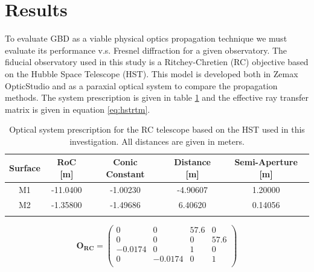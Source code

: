 \section{Results}
To evaluate GBD as a viable physical optics propagation technique we must evaluate its performance v.s. Fresnel diffraction for a given observatory. The fiducial observatory used in this study is a Ritchey-Chretien (RC) objective based on the Hubble Space Telescope (HST). This model is developed both in Zemax OpticStudio and as a paraxial optical system to compare the propagation methods. The system prescription is given in table \ref{tab:fiducial_observatory_specs} and the effective ray transfer matrix is given in equation \ref{eq:hstrtm}. 

\begin{table}[H]
    \centering
    \begin{tabular}{c c c c c}
        \hline
        Surface & RoC [m] & Conic Constant & Distance [m] & Semi-Aperture [m]  \\
        \hline
        M1 & -11.0400 & -1.00230 & -4.90607 & 1.20000 \\
        M2 & -1.35800 & -1.49686 &  6.40620 & 0.14056 \\
        \hline
        \\
    \end{tabular}
    \caption{Optical system prescription for the RC telescope based on the HST used in this investigation. All distances are given in meters. }
    \label{tab:fiducial_observatory_specs}
\end{table}

\begin{equation}
    \mathbf{O_{RC}} =
    \begin{pmatrix}
    0 & 0 & 57.6 & 0 \\
    0 & 0 & 0 & 57.6 \\
    -0.0174 & 0 & 1 & 0 \\
    0 & -0.0174 & 0 & 1 \\
    \end{pmatrix}
    \label{eq:hstrtm}
\end{equation}


